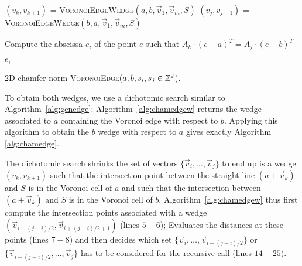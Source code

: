 \documentclass{llncs}
\begin{document}
\begin{algorithm}[H]
  $(v_k,v_{k+1})$ = \textsc{VoronoiEdgeWedge}$(a,b,\vec{v}_1,\vec{v}_m, S)$\;
  $(v_j,v_{j+1})$ = \textsc{VoronoiEdgeWedge}$(b,a,\vec{v}_1,\vec{v}_m, S)$\;

  Compute the abscissa $e_i$ of the point $e$ such that $A_k\cdot
  (e-a)^T = A_j\cdot (e -b)^T$\;

  \Return $e_i$\;
  \caption{2D chamfer norm \textsc{VoronoiEdge}($a,b,s_i,s_j\in{\mathbb{Z}}^2$).\label{alg:chamedge}}
\end{algorithm}

To obtain both wedges, we use a dichotomic search similar to
Algorithm~\ref{alg:genedge}: Algorithm~\ref{alg:chamedgew} returns the
wedge associated to $a$ containing the Voronoi edge with respect to
$b$. Applying this algorithm to obtain the $b$ wedge with respect to
$a$ gives exactly  Algorithm \ref{alg:chamedge}.

The dichotomic search shrinks the set of vectors
$\{\vec{v}_i,\ldots,\vec{v}_j\}$ to end up is a wedge $(v_k,v_{k+1})$
such that the intersection point between the straight line $(a +
\vec{v}_k)$ and $S$ is in the Voronoi cell of $a$ and such that the
intersection between $(a + \vec{v}_k)$ and $S$ is in the Voronoi cell
of $b$. Algorithm~\ref{alg:chamedgew} thus first compute the
intersection points associated with a wedge $(\vec{v}_{i+(j-i)/2},
\vec{v}_{i+(j-i)/2+1})$ (lines $5-6$); Evaluates the distances at
these points (lines $7-8$) and then decides which set
$\{\vec{v}_i,\ldots,\vec{v}_{i+(j-i)/2}\}$ or
$\{\vec{v}_{i+(j-i)/2},\ldots,\vec{v}_j\}$ has to be considered for
the recursive call (lines $14-25$).
\end{document}
